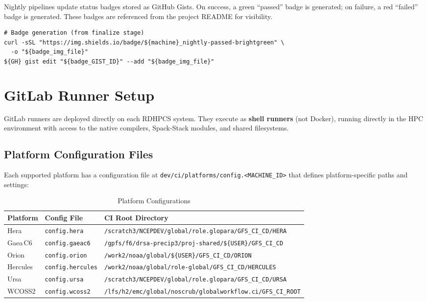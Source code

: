 \documentclass[11pt,letterpaper,twoside]{article}
\begin{document}
Nightly pipelines update status badges stored as GitHub Gists. On success, a
green ``passed'' badge is generated; on failure, a red ``failed'' badge is
generated. These badges are referenced from the project README for visibility.

\begin{lstlisting}[style=bash, numbers=none]
# Badge generation (from finalize stage)
curl -sSL "https://img.shields.io/badge/${machine}_nightly-passed-brightgreen" \
  -o "${badge_img_file}"
${GH} gist edit "${badge_GIST_ID}" --add "${badge_img_file}"
\end{lstlisting}


\section{GitLab Runner Setup}
\label{sec:runners}

GitLab runners are deployed directly on each RDHPCS system. They execute as
\textbf{shell runners} (not Docker), running directly in the HPC environment
with access to the native compilers, Spack-Stack modules, and shared
filesystems.

\subsection{Platform Configuration Files}
\label{sec:platform-config}

Each supported platform has a configuration file at
\texttt{dev/ci/platforms/config.<MACHINE\_ID>} that defines platform-specific
paths and settings:

\begin{table}[H]
\centering
\caption{Platform Configurations}
\label{tab:platform-config}
\begin{tabularx}{\linewidth}{llX}
\toprule
\textbf{Platform} & \textbf{Config File} & \textbf{CI Root Directory} \\
\midrule
Hera & \texttt{config.hera} & {\small\texttt{/scratch3/NCEPDEV/global/\allowbreak role.glopara/GFS\_CI\_CD/HERA}} \\
Gaea\,C6 & \texttt{config.gaeac6} & {\small\texttt{/gpfs/f6/drsa-precip3/\allowbreak proj-shared/\$\{USER\}/GFS\_CI\_CD}} \\
Orion & \texttt{config.orion} & \texttt{/work2/noaa/global/\$\{USER\}/GFS\_CI\_CD/ORION} \\
Hercules & \texttt{config.hercules} & {\small\texttt{/work2/noaa/global/role-global/\allowbreak GFS\_CI\_CD/HERCULES}} \\
Ursa & \texttt{config.ursa} & {\small\texttt{/scratch3/NCEPDEV/global/\allowbreak role.glopara/GFS\_CI\_CD/URSA}} \\
WCOSS2 & \texttt{config.wcoss2} & {\small\texttt{/lfs/h2/emc/global/noscrub/\allowbreak globalworkflow.ci/GFS\_CI\_ROOT}} \\
\bottomrule
\end{tabularx}
\end{table}
\end{document}
